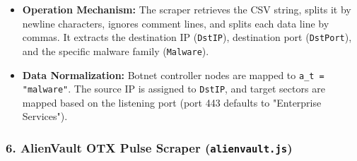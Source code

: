 \begin{itemize}
    \item \textbf{Operation Mechanism:} The scraper retrieves the CSV string, splits it by newline characters, ignores comment lines, and splits each data line by commas. It extracts the destination IP (\texttt{DstIP}), destination port (\texttt{DstPort}), and the specific malware family (\texttt{Malware}).
    \item \textbf{Data Normalization:} Botnet controller nodes are mapped to \texttt{a\_t = "malware"}. The source IP is assigned to \texttt{DstIP}, and target sectors are mapped based on the listening port (port 443 defaults to "Enterprise Services").
\end{itemize}

\subsubsection{6. AlienVault OTX Pulse Scraper (\texttt{alienvault.js})}
